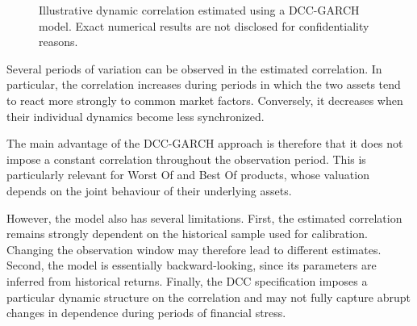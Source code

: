\documentclass{article}
\begin{document}
\begin{figure}[H]
    \centering
    \caption{
        Illustrative dynamic correlation estimated using a DCC-GARCH
        model. Exact numerical results are not disclosed for
        confidentiality reasons.
    }
    \label{fig:dcc_correlation}
\end{figure}

Several periods of variation can be observed in the estimated
correlation. In particular, the correlation increases during periods
in which the two assets tend to react more strongly to common market
factors. Conversely, it decreases when their individual dynamics
become less synchronized.

The main advantage of the DCC-GARCH approach is therefore that it
does not impose a constant correlation throughout the observation
period. This is particularly relevant for Worst Of and Best Of
products, whose valuation depends on the joint behaviour of their
underlying assets.

However, the model also has several limitations. First, the estimated
correlation remains strongly dependent on the historical sample used
for calibration. Changing the observation window may therefore lead
to different estimates. Second, the model is essentially
backward-looking, since its parameters are inferred from historical
returns. Finally, the DCC specification imposes a particular dynamic
structure on the correlation and may not fully capture abrupt changes
in dependence during periods of financial stress.
\end{document}
